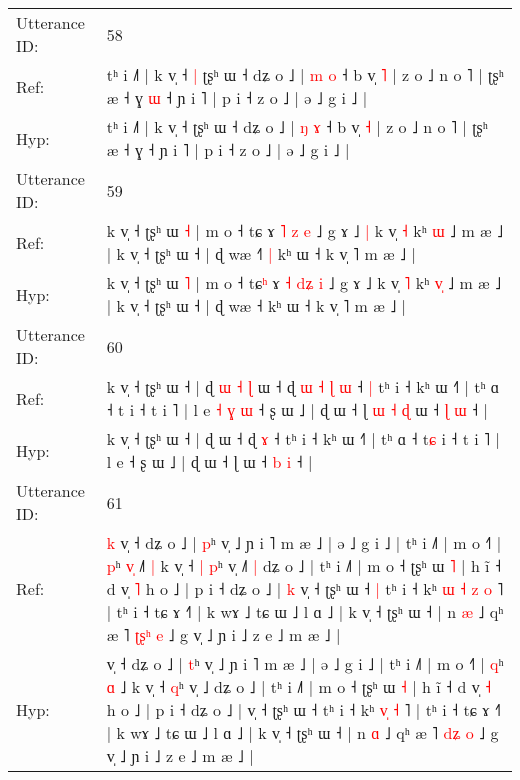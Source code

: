 \documentclass[10pt]{article}
\DeclareRobustCommand{\hl}[1]{{\textcolor{red}{#1}}}
\begin{document}
\begin{longtable}{ll}
 \\
\midrule
Utterance ID: & 58 \\
Ref: & tʰ i ˩˥ | k v̩ ˧\hl{ }\hl{|} ʈʂʰ ɯ ˧ dʑ o ˩ | \hl{m} \hl{o} ˧ b v̩ \hl{˥} | z o ˩ n o ˥ | ʈʂʰ æ ˧ ɣ\hl{ }\hl{ɯ} ˧ ɲ i ˥ | p i ˧ z o ˩ | ə ˩ g i ˩ |
 \\
Hyp: & tʰ i ˩˥ | k v̩ ˧\hl{}\hl{} ʈʂʰ ɯ ˧ dʑ o ˩ | \hl{ŋ} \hl{ɤ} ˧ b v̩ \hl{˧} | z o ˩ n o ˥ | ʈʂʰ æ ˧ ɣ\hl{}\hl{} ˧ ɲ i ˥ | p i ˧ z o ˩ | ə ˩ g i ˩ |
 \\
\midrule
Utterance ID: & 59 \\
Ref: & k v̩ ˧ ʈʂʰ ɯ \hl{˧} | m o ˧ tɕ\hl{} ɤ \hl{˥} \hl{}\hl{z} \hl{e} ˩ g ɤ ˩\hl{ }\hl{|} k v̩ \hl{˧} kʰ \hl{}\hl{ɯ} ˩ m æ ˩ | k v̩ ˧ ʈʂʰ ɯ ˧ | ɖ wæ ˧\hl{˥}\hl{ }\hl{|} kʰ ɯ ˧ k v̩ ˥ m æ ˩ |
 \\
Hyp: & k v̩ ˧ ʈʂʰ ɯ \hl{˥} | m o ˧ tɕ\hl{ʰ} ɤ \hl{˧} \hl{d}\hl{ʑ} \hl{i} ˩ g ɤ ˩\hl{}\hl{} k v̩ \hl{˥} kʰ \hl{v}\hl{̩} ˩ m æ ˩ | k v̩ ˧ ʈʂʰ ɯ ˧ | ɖ wæ ˧\hl{}\hl{}\hl{} kʰ ɯ ˧ k v̩ ˥ m æ ˩ |
 \\
\midrule
Utterance ID: & 60 \\
Ref: & k v̩ ˧ ʈʂʰ ɯ ˧ | ɖ\hl{ }\hl{ɯ}\hl{ }\hl{˧}\hl{ }\hl{ɭ} ɯ ˧ ɖ\hl{ }\hl{ɯ}\hl{ }\hl{˧}\hl{ }\hl{ɭ} \hl{ɯ} ˧\hl{ }\hl{|} tʰ i ˧ kʰ ɯ ˧˥ | tʰ ɑ ˧ t\hl{} i ˧ t i ˥ | l e\hl{ }\hl{˧}\hl{ }\hl{ɣ}\hl{ }\hl{ɯ} ˧ ʂ ɯ ˩ | ɖ ɯ ˧ ɭ\hl{ }\hl{ɯ}\hl{ }\hl{˧}\hl{ }\hl{ɖ} ɯ ˧ \hl{ɭ} \hl{ɯ} ˧ |
 \\
Hyp: & k v̩ ˧ ʈʂʰ ɯ ˧ | ɖ\hl{}\hl{}\hl{}\hl{}\hl{}\hl{} ɯ ˧ ɖ\hl{}\hl{}\hl{}\hl{}\hl{}\hl{} \hl{ɤ} ˧\hl{}\hl{} tʰ i ˧ kʰ ɯ ˧˥ | tʰ ɑ ˧ t\hl{ɕ} i ˧ t i ˥ | l e\hl{}\hl{}\hl{}\hl{}\hl{}\hl{} ˧ ʂ ɯ ˩ | ɖ ɯ ˧ ɭ\hl{}\hl{}\hl{}\hl{}\hl{}\hl{} ɯ ˧ \hl{b} \hl{i} ˧ |
 \\
\midrule
Utterance ID: & 61 \\
Ref: & \hl{k}\hl{ }v̩ ˧ dʑ o ˩ | \hl{p}ʰ v̩ ˩ ɲ i ˥ m æ ˩ | ə ˩ g i ˩ | tʰ i ˩˥ | m o ˧˥ | \hl{p}ʰ \hl{v}\hl{̩} ˩\hl{˥}\hl{ }\hl{|} k v̩ ˧\hl{ }\hl{|} \hl{p}ʰ v̩ ˩\hl{˥}\hl{ }\hl{|} dʑ o ˩ | tʰ i ˩˥ | m o ˧ ʈʂʰ ɯ \hl{˥} | h ĩ ˧ d v̩ \hl{˥} h o ˩ | p i ˧ dʑ o ˩ |\hl{ }\hl{k} v̩ ˧ ʈʂʰ ɯ ˧\hl{ }\hl{|} tʰ i ˧ kʰ\hl{ }\hl{ɯ} \hl{˧}\hl{ }\hl{z} \hl{o} ˥ | tʰ i ˧ tɕ ɤ ˧˥ | k wɤ ˩ tɕ ɯ ˩ l ɑ ˩ | k v̩ ˧ ʈʂʰ ɯ ˧ | n \hl{æ} ˩ qʰ æ ˥ \hl{ʈ}\hl{ʂ}\hl{ʰ} \hl{e} ˩ g v̩ ˩ ɲ i ˩ z e ˩ m æ ˩ |
 \\
Hyp: & \hl{}\hl{}v̩ ˧ dʑ o ˩ | \hl{t}ʰ v̩ ˩ ɲ i ˥ m æ ˩ | ə ˩ g i ˩ | tʰ i ˩˥ | m o ˧˥ | \hl{q}ʰ \hl{}\hl{ɑ} ˩\hl{}\hl{}\hl{} k v̩ ˧\hl{}\hl{} \hl{q}ʰ v̩ ˩\hl{}\hl{}\hl{} dʑ o ˩ | tʰ i ˩˥ | m o ˧ ʈʂʰ ɯ \hl{˧} | h ĩ ˧ d v̩ \hl{˧} h o ˩ | p i ˧ dʑ o ˩ |\hl{}\hl{} v̩ ˧ ʈʂʰ ɯ ˧\hl{}\hl{} tʰ i ˧ kʰ\hl{}\hl{} \hl{}\hl{v}\hl{̩} \hl{˧} ˥ | tʰ i ˧ tɕ ɤ ˧˥ | k wɤ ˩ tɕ ɯ ˩ l ɑ ˩ | k v̩ ˧ ʈʂʰ ɯ ˧ | n \hl{ɑ} ˩ qʰ æ ˥ \hl{}\hl{d}\hl{ʑ} \hl{o} ˩ g v̩ ˩ ɲ i ˩ z e ˩ m æ ˩ |

\end{longtable}
\end{document}
